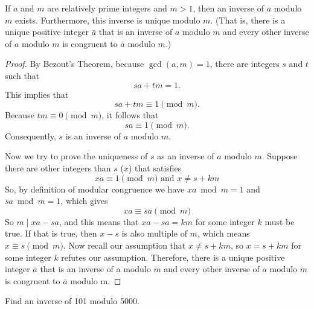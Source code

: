         \begin{theorem}\label{exist_inverse}
            If \( a \) and \( m \) are relatively prime integers and \( m > 1 \), then an inverse of \( a \) modulo \( m \) exists. Furthermore, this inverse is unique modulo \( m \). (That is, there is a unique positive integer \( \bar{a} \) that is an inverse of \( a \) modulo \( m \) and every other inverse of \( a \) modulo \( m \) is congruent to \( \bar{a} \) modulo \( m \).)
            \end{theorem}
            
            \begin{proof}
            By Bezout's Theorem, because \( \gcd(a, m) = 1 \), there are integers \( s \) and \( t \) such that
            \[
            sa + tm = 1.
            \]
            This implies that
            \[
            sa + tm \equiv 1 \pmod{m}.
            \]
            Because \( tm \equiv 0 \pmod{m} \), it follows that
            \[
            sa \equiv 1 \pmod{m}.
            \]
            Consequently, \( s \) is an inverse of \( a \) modulo \( m \).

            Now we try to prove the uniqueness of $s$ as an inverse of \( a \) modulo \( m \).
            Suppose there are other integers than $s$ ($x$) that satisfies  
            \[ xa \equiv 1 \pmod{m} \text{ and } x \neq s + km\]
            So, by definition of modular congruence we have $xa \bmod m = 1$ and $sa \bmod m = 1$, which
            gives
            $$xa \equiv sa \pmod m$$
            So $m\mid xa - sa$, and this means that $xa - sa = km$ for some integer $k$ must be true.
            If that is true, then $x-s$ is also multiple of $m$, which means $x\equiv s \pmod m$.
            Now recall our assumption that $x\neq s + km$, so $x = s + km$ for some integer $k$ refutes
            our assumption. Therefore, there is a unique positive integer $\bar{a}$ that is an inverse of a 
            modulo $m$ and every other inverse of $a$ modulo $m$ is congruent to $\bar{a}$ modulo m.
            \end{proof}
        
        \begin{example}
            Find an inverse of 101 modulo 5000.
        \end{example}
